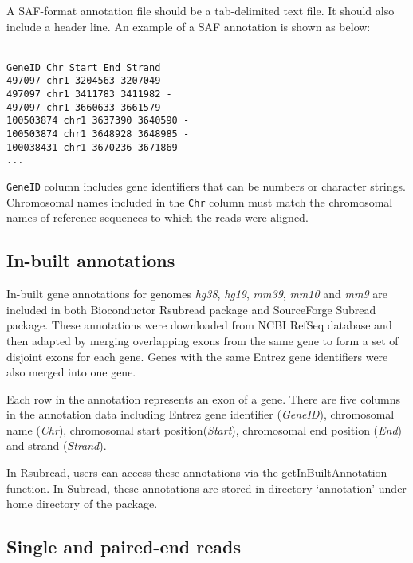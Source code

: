 \documentclass[12pt]{report}
\newcommand{\code}[1]{{\small\texttt{#1}}}
\newcommand{\Subread}{\textsf{Subread}}
\newcommand{\Rsubread}{\textsf{Rsubread}}
\begin{document}
A SAF-format annotation file should be a tab-delimited text file.
It should also include a header line.
An example of a SAF annotation is shown as below:

\code{\\
GeneID	Chr	Start	End	Strand\\
497097	chr1	3204563	3207049	-\\
497097	chr1	3411783	3411982	-\\
497097	chr1	3660633	3661579	-\\
100503874	chr1	3637390	3640590	-\\
100503874	chr1	3648928	3648985	-\\
100038431	chr1	3670236	3671869	-\\
...
}

\code{GeneID} column includes gene identifiers that can be numbers or character strings.
Chromosomal names included in the \code{Chr} column must match the chromosomal names of reference sequences to which the reads were aligned.

\subsection{In-built annotations}

In-built gene annotations for genomes \emph{hg38}, \emph{hg19}, \emph{mm39}, \emph{mm10} and \emph{mm9} are included in both Bioconductor {\Rsubread} package and SourceForge {\Subread} package.
These annotations were downloaded from NCBI RefSeq database and then adapted by merging overlapping exons from the same gene to form a set of disjoint exons for each gene.
Genes with the same Entrez gene identifiers were also merged into one gene.

Each row in the annotation represents an exon of a gene. There are five columns in the annotation data including Entrez gene identifier (\emph{GeneID}), chromosomal name (\emph{Chr}), chromosomal start position(\emph{Start}), chromosomal end position (\emph{End}) and strand (\emph{Strand}).

In {\Rsubread}, users can access these annotations via the {\textsf{getInBuiltAnnotation}} function.
In {\Subread}, these annotations are stored in directory `annotation' under home directory of the package.


\subsection{Single and paired-end reads}
\end{document}

